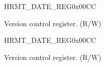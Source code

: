 {%
\begin{register}{H}{RMT\_DATE\_REG}{0x00CC}\label{regdesc:RMTDATEREG}
%
%
\regnewline%
\begin{regdesc}\begin{reglist}
\label{fielddesc:RMTDATE}\item [RMT\_DATE] Version control register. (R/W)
\end{reglist}\end{regdesc}
\end{register}
}
{%
\begin{register}{H}{RMT\_DATE\_REG}{0x00CC}\label{regdesc:RMTDATEREG}
%
%
\regnewline%
\begin{regdesc}\begin{reglist}
\label{fielddesc:RMTDATE}\item [RMT\_DATE] Version control register. (R/W)
\end{reglist}\end{regdesc}
\end{register}
}
